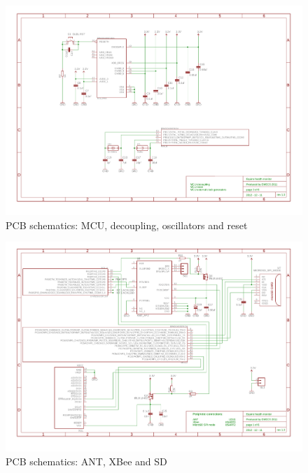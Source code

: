 \begin{figure}[htb]
\centering
\includegraphics[width=\columnwidth]{Images/pcb_mcu_osc_reset}
\caption{PCB schematics: MCU, decoupling, oscillators and reset}
\label{fig:pcb_schematics_4}
\end{figure}

\begin{figure}[htb]
\centering
\includegraphics[width=\columnwidth]{Images/pcb_ant}
\caption{PCB schematics: ANT, XBee and SD}
\label{fig:pcb_schematics_1}
\end{figure}

